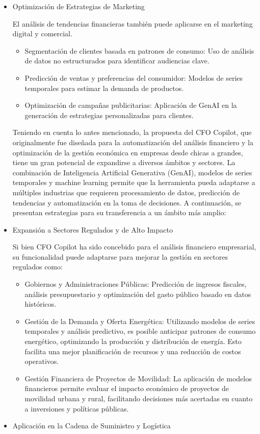 \documentclass[12pt,letterpaper,oneside]{report}
\renewcommand{\_}{\UnderscoreOriginal\allowbreak}
\begin{document}
\begin{itemize}
\item Optimización de Estrategias de Marketing \parencite{Patil2024,Haque2023}

El análisis de tendencias financieras también puede aplicarse en el marketing digital y comercial.
\begin{itemize}
\item Segmentación de clientes basada en patrones de consumo: Uso de análisis de datos no estructurados para identificar audiencias clave.
\item Predicción de ventas y preferencias del consumidor: Modelos de series temporales para estimar la demanda de productos.
\item Optimización de campañas publicitarias: Aplicación de GenAI en la generación de estrategias personalizadas para clientes.
\end{itemize}

Teniendo en cuenta lo antes mencionado, la propuesta del CFO Copilot, que originalmente fue diseñada para la automatización del análisis financiero y la optimización de la gestión económica en empresas desde chicas a grandes, tiene un gran potencial de expandirse a diversos ámbitos y sectores. La combinación de Inteligencia Artificial Generativa (GenAI), modelos de series temporales y machine learning permite que la herramienta pueda adaptarse a múltiples industrias que requieren procesamiento de datos, predicción de tendencias y automatización en la toma de decisiones. A continuación, se presentan estrategias para su transferencia a un ámbito más amplio:

\item Expansión a Sectores Regulados y de Alto Impacto \parencite{Cerda2019}

Si bien CFO Copilot ha sido concebido para el análisis financiero empresarial, su funcionalidad puede adaptarse para mejorar la gestión en sectores regulados como:
\begin{itemize}
\item Gobiernos y Administraciones Públicas: Predicción de ingresos fiscales, análisis presupuestario y optimización del gasto público basado en datos históricos.
\item Gestión de la Demanda y Oferta Energética: Utilizando modelos de series temporales y análisis predictivo, es posible anticipar patrones de consumo energético, optimizando la producción y distribución de energía. Esto facilita una mejor planificación de recursos y una reducción de costos operativos.
\item Gestión Financiera de Proyectos de Movilidad: La aplicación de modelos financieros permite evaluar el impacto económico de proyectos de movilidad urbana y rural, facilitando decisiones más acertadas en cuanto a inversiones y políticas públicas.
\end{itemize}
\item Aplicación en la Cadena de Suministro y Logística \parencite{Hernandez2024}


\end{itemize}
\end{document}
